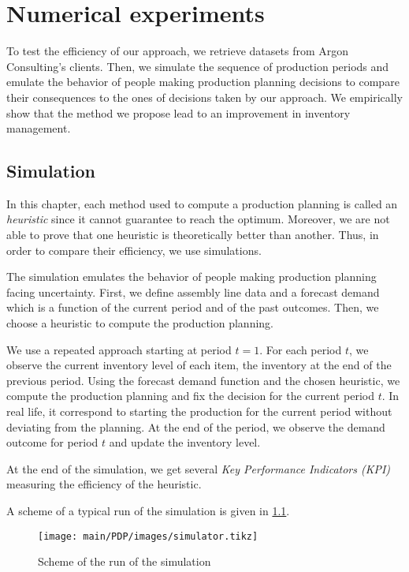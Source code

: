 \chapter{Numerical experiments}
\label{chap:PDP:numerical-experiments}


To test the efficiency of our approach, we retrieve datasets from Argon Consulting's clients.
Then, we simulate the sequence of production periods and emulate the behavior of people making production planning decisions to compare their consequences to the ones of decisions taken by our approach.
We empirically show that the method we propose lead to an improvement in inventory management.


\section{Simulation}


In this chapter, each method used to compute a production planning is called an \emph{heuristic} since it cannot guarantee to reach the optimum.
Moreover, we are not able to prove that one heuristic is theoretically better than another.
Thus, in order to compare their efficiency, we use simulations.


The simulation emulates the behavior of people making production planning facing uncertainty.
First, we define assembly line data and a forecast demand which is a function of the current period and of the past outcomes.
Then, we choose a heuristic to compute the production planning.


We use a repeated approach starting at period $t=1$.
For each period $t$, we observe the current inventory level of each item, \ie the inventory at the end of the previous period.
Using the forecast demand function and the chosen heuristic, we compute the production planning and fix the decision for the current period $t$.
In real life, it correspond to starting the production for the current period without deviating from the planning.
At the end of the period, we observe the demand outcome for period $t$ and update the inventory level.


At the end of the simulation, we get several \emph{Key Performance Indicators (KPI)} measuring the efficiency of the heuristic.


A scheme of a typical run of the simulation is given in \cref{fig:simulator}.

\begin{figure}[h]
  \centering
  \texttt{[image: main/PDP/images/simulator.tikz]}
  \caption{Scheme of the run of the simulation}
  \label{fig:simulator}
\end{figure}


